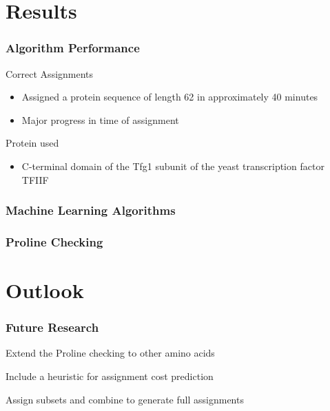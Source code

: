 \documentclass{beamer}
\begin{document}
\section{Results}
\begin{frame}
	\frametitle{Algorithm Performance}
	\begin{block}{Correct Assignments}
	\begin{itemize}
		\item Assigned a protein sequence of length 62 in approximately 40 minutes
		\item Major progress in time of assignment
	\end{itemize}
	\end{block}
	\begin{block}{Protein used}
	\begin{itemize}
		\item C-terminal domain of the Tfg1 subunit of the yeast transcription factor TFIIF\autocite{kilpatrick}
	\end{itemize}
		
	\end{block}
\end{frame}

\begin{frame}
	\frametitle{Machine Learning Algorithms}
	\resizebox{!}{0.7\textwidth}{}
\end{frame}

\begin{frame}
	\frametitle{Proline Checking}
	\resizebox{!}{0.7\textwidth}{}
\end{frame}

\section{Outlook}
\begin{frame}
	\frametitle{Future Research}
	\begin{block}{Extend the Proline checking to other amino acids}
	\end{block}

	\begin{block}{Include a heuristic for assignment cost prediction}
	\end{block}

	\begin{block}{Assign subsets and combine to generate full assignments}
	\end{block}
\end{frame}
\end{document}

